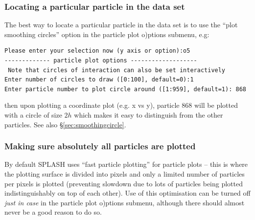 \documentclass[a4paper,10pt]{article}
\newcommand{\splash}{\textsc{SPLASH }}
\begin{document}
\subsubsection{ Locating a particular particle in the data set}
\label{sec:findingaparticle}
 The best way to locate a particular particle in the data set is to use the ``plot smoothing circles'' option in the particle plot o)ptions submenu, e.g:
\begin{verbatim}
Please enter your selection now (y axis or option):o5
------------- particle plot options -------------------
 Note that circles of interaction can also be set interactively
Enter number of circles to draw ([0:100], default=0):1
Enter particle number to plot circle around ([1:959], default=1): 868
\end{verbatim}
 then upon plotting a coordinate plot (e.g. x vs y), particle 868 will be plotted with a circle of size $2h$ which makes it easy to distinguish from the other particles. See also \S\ref{sec:smoothingcircle}.

\subsubsection{ Making sure absolutely all particles are plotted}
 By default \splash uses ``fast particle plotting'' for particle plots -- this is where the plotting surface is divided into pixels and only a limited number of particles per pixels is plotted (preventing slowdown due to lots of particles being plotted indistinguishably on top of each other). Use of this optimisation can be turned off \emph{just in case} in the particle plot o)ptions submenu, although there should almost never be a good reason to do so.
\end{document}
